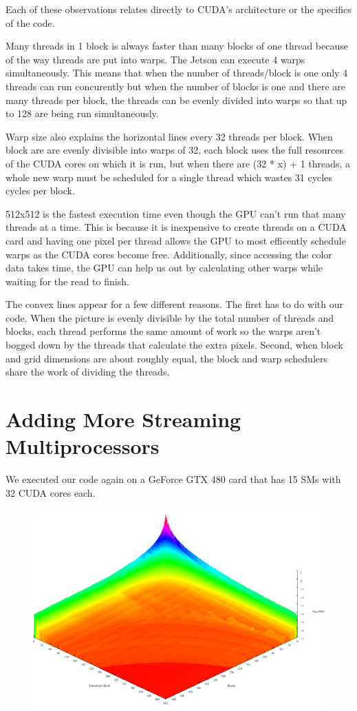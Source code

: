 \documentclass[letterpaper,10pt,openany,oneside]{sphinxmanual}
\begin{document}
Each of these observations relates directly to CUDA's
architecture or the specifics of the code.

Many threads in 1 block is always faster than many blocks of
one thread because of the way threads are put into warps.
The Jetson can execute 4 warps simultaneously. This means that
when the number of threads/block is one only 4 threads can run concurently
but when the number of blocks is one and there are many threads per block,
the threads can be evenly divided
into warps so that up to 128 are being run simultaneously.

Warp size also explains the horizontal lines every
32 threads per block. When block are are evenly divisible
into warps of 32, each block uses the full resources of the
CUDA cores on which it is run, but when there are (32 * x) +
1 threads, a whole new warp must be scheduled for a single
thread which wastes 31 cycles cycles per block.

512x512 is the fastest execution time even though the GPU
can't run that many threads at a time. This is because
it is inexpensive to create threads on a CUDA card and having
one pixel per thread allows the GPU to
most efficently schedule warps as the CUDA cores become free.
Additionally, since accessing the color data takes time, the
GPU can help us out by calculating other warps while waiting
for the read to finish.

The convex lines appear for a few different reasons. The
first has to do with our code. When the picture is evenly
divisible by the total number of threads and blocks, each
thread performs the same amount of work so the warps aren't
bogged down by the threads that calculate the extra pixels.
Second, when block and grid dimensions are about roughly
equal, the block and warp schedulers share the work of
dividing the threads.


\section{Adding More Streaming Multiprocessors}
\label{2-Findings/Findings:adding-more-streaming-multiprocessors}
We executed our code again on a GeForce GTX 480 card that
has 15 SMs with 32 CUDA cores each.
\begin{figure}[htbp]
\centering

\includegraphics{Dev0Medium.png}
\end{figure}
\end{document}
